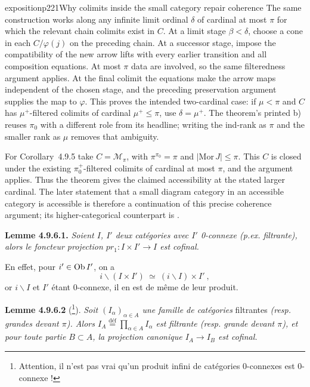 \begin{dcomment}{exposition}{p221}{Why colimits inside the small category repair coherence}
The same construction works along any infinite limit ordinal $\delta$ of cardinal at most $\pi$ for which the relevant chain colimits exist in $C$. At a limit stage $\beta<\delta$, choose a cone in each $C/\varphi(j)$ on the preceding chain. At a successor stage, impose the compatibility of the new arrow lifts with every earlier transition and all composition equations. At most $\pi$ data are involved, so the same filteredness argument applies. At the final colimit the equations make the arrow maps independent of the chosen stage, and the preceding preservation argument supplies the map to $\varphi$. This proves the intended two-cardinal case: if $\mu<\pi$ and $C$ has $\mu^+$-filtered colimits of cardinal $\mu^+\leq\pi$, use $\delta=\mu^+$. The theorem's printed b) reuses $\pi_0$ with a different role from its headline; writing the ind-rank as $\pi$ and the smaller rank as $\mu$ removes that ambiguity.

For Corollary~4.9.5 take $C=\mathcal M_\pi$, with $\pi^{\pi_0}=\pi$ and $|\mathrm{Mor}\,J|\leq\pi$. This $C$ is closed under the existing $\pi_0^+$-filtered colimits of cardinal at most $\pi$, and the argument applies. Thus the theorem gives the claimed accessibility at the stated larger cardinal. The later statement that a small diagram category in an accessible category is accessible is therefore a continuation of this precise coherence argument; its higher-categorical counterpart is \citet[Proposition~5.4.4.3]{Lurie2009HTT}.
\end{dcomment}


\textbf{Lemme 4.9.6.1.} \textit{Soient $I$, $I'$ deux catégories avec $I'$ \textup{0}-connexe (p.ex. filtrante), alors le foncteur projection $pr_1 : I \times I' \longrightarrow I$ est cofinal.}

En effet, pour $i' \in \operatorname{Ob} I'$, on a
\[
i\backslash(I \times I') \ \simeq \ (i\backslash I) \times I' \ ,
\]
or $i\backslash I$ et $I'$ étant 0-connexe, il en est de même de leur produit.

\textbf{Lemme 4.9.6.2} (\footnote[97]{Attention, il n'est pas vrai qu'un produit infini de catégories 0-connexes est 0-connexe !}). \textit{Soit $(I_\alpha)_{\alpha \in A}$ une famille de catégories} filtrantes \textit{(resp. grandes devant $\pi$). Alors $I_A \stackrel{\text{déf}}{=} \prod_{\alpha \in A} I_\alpha$ est filtrante (resp. grande devant $\pi$), et pour toute partie $B \subset A$, la projection canonique $I_A \longrightarrow I_B$ est cofinal.} %

